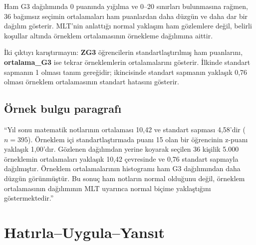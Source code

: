 Ham G3 dağılımında 0 puanında yığılma ve 0--20 sınırları bulunmasına rağmen,
36 bağımsız seçimin ortalamaları ham puanlardan daha düzgün ve daha dar bir
dağılım gösterir. MLT'nin anlattığı normal yaklaşım ham gözlemlere değil,
belirli koşullar altında örneklem ortalamasının örnekleme dağılımına aittir.

\begin{outputguidebox}
İki çıktıyı karıştırmayın: \textbf{ZG3} öğrencilerin standartlaştırılmış ham
puanlarını, \textbf{ortalama\_G3} ise tekrar örneklemlerin ortalamalarını
gösterir. İlkinde standart sapmanın 1 olması tanım gereğidir; ikincisinde
standart sapmanın yaklaşık 0,76 olması örneklem ortalamasının standart
hatasını gösterir.
\end{outputguidebox}

\subsection{Örnek bulgu paragrafı}

``Yıl sonu matematik notlarının ortalaması 10,42 ve standart sapması 4,58'dir
($n=395$). Örneklem içi standartlaştırmada puanı 15 olan bir öğrencinin
z-puanı yaklaşık 1,00'dır. Gözlenen dağılımdan yerine koyarak seçilen 36
kişilik 5.000 örneklemin ortalamaları yaklaşık 10,42 çevresinde ve 0,76
standart sapmayla dağılmıştır. Örneklem ortalamalarının histogramı ham G3
dağılımından daha düzgün görünmüştür. Bu sonuç ham notların normal olduğunu
değil, örneklem ortalamasının dağılımının MLT uyarınca normal biçime
yaklaştığını göstermektedir.''




\section*{Hatırla--Uygula--Yansıt}

